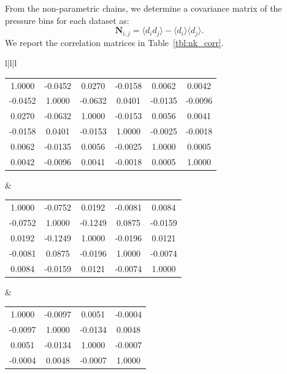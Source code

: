 \documentclass[iop,numberedappendix,apj]{emulateapj}
\begin{document}
From the non-parametric chains, we determine a covariance matrix of the pressure bins for each dataset as:
\begin{equation}
  \mathbf{N}_{i,j} = \langle d_i d_j \rangle - \langle d_i \rangle \langle d_j \rangle.
  \label{eqn:covariance}
\end{equation}
We report the correlation matrices in Table~\ref{tbl:nk_corr}.

\begin{deluxetable*}{l|l|l}
\tabletypesize{\footnotesize}
\tablewidth{0pt} 
\startdata
\begin{tabular}{cccccc}
 1.0000  & -0.0452  &  0.0270  & -0.0158  &  0.0062  &  0.0042  \\
-0.0452  &  1.0000  & -0.0632  &  0.0401  & -0.0135  & -0.0096  \\
 0.0270  & -0.0632  &  1.0000  & -0.0153  &  0.0056  &  0.0041  \\
-0.0158  &  0.0401  & -0.0153  &  1.0000  & -0.0025  & -0.0018  \\
 0.0062  & -0.0135  &  0.0056  & -0.0025  &  1.0000  &  0.0005  \\
 0.0042  & -0.0096  &  0.0041  & -0.0018  &  0.0005  &  1.0000  
\end{tabular}
&
\begin{tabular}{ccccc}
 1.0000  & -0.0752  &  0.0192  & -0.0081  &  0.0084  \\
-0.0752  &  1.0000  & -0.1249  &  0.0875  & -0.0159  \\
 0.0192  & -0.1249  &  1.0000  & -0.0196  &  0.0121  \\
-0.0081  &  0.0875  & -0.0196  &  1.0000  & -0.0074  \\
 0.0084  & -0.0159  &  0.0121  & -0.0074  &  1.0000  
\end{tabular}
&
\begin{tabular}{cccc}
 1.0000  & -0.0097  &  0.0051  & -0.0004 \\
-0.0097  &  1.0000  & -0.0134  &  0.0048 \\
 0.0051  & -0.0134  &  1.0000  & -0.0007 \\
-0.0004  &  0.0048  & -0.0007  &  1.0000  
\end{tabular}
 \enddata
\end{deluxetable*}
\end{document}
